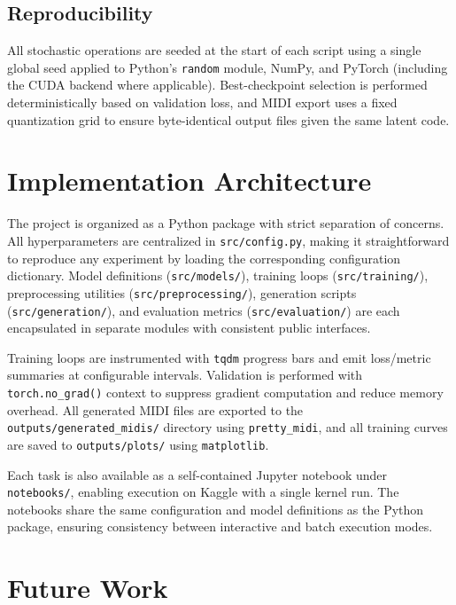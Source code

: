 \documentclass{article}
\begin{document}
\subsection{Reproducibility}

All stochastic operations are seeded at the start of each script using a single global seed applied to Python's \texttt{random} module, NumPy, and PyTorch (including the CUDA backend where applicable). Best-checkpoint selection is performed deterministically based on validation loss, and MIDI export uses a fixed quantization grid to ensure byte-identical output files given the same latent code.

\section{Implementation Architecture}
\label{sec:impl}

The project is organized as a Python package with strict separation of concerns. All hyperparameters are centralized in \texttt{src/config.py}, making it straightforward to reproduce any experiment by loading the corresponding configuration dictionary. Model definitions (\texttt{src/models/}), training loops (\texttt{src/training/}), preprocessing utilities (\texttt{src/preprocessing/}), generation scripts (\texttt{src/generation/}), and evaluation metrics (\texttt{src/evaluation/}) are each encapsulated in separate modules with consistent public interfaces.

Training loops are instrumented with \texttt{tqdm} progress bars and emit loss/metric summaries at configurable intervals. Validation is performed with \texttt{torch.no\_grad()} context to suppress gradient computation and reduce memory overhead. All generated MIDI files are exported to the \texttt{outputs/generated\_midis/} directory using \texttt{pretty\_midi}, and all training curves are saved to \texttt{outputs/plots/} using \texttt{matplotlib}.

Each task is also available as a self-contained Jupyter notebook under \texttt{notebooks/}, enabling execution on Kaggle with a single kernel run. The notebooks share the same configuration and model definitions as the Python package, ensuring consistency between interactive and batch execution modes.

\section{Future Work}
\label{sec:future}
\end{document}
